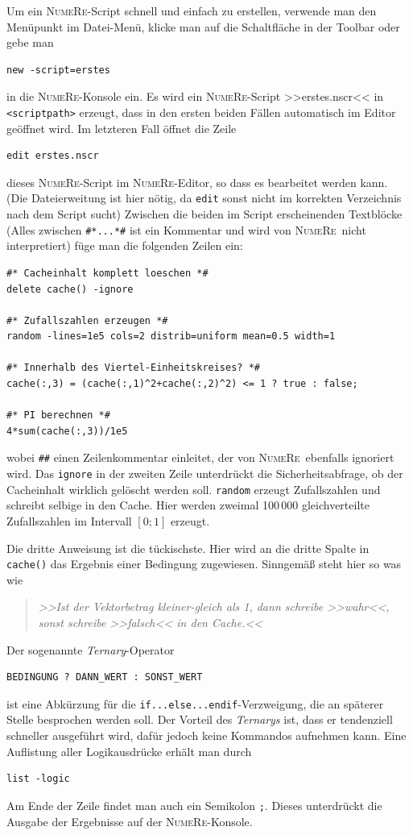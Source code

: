 \documentclass[DIV=14,headsepline,footsepline]{scrbook}
\newcommand{\NR}{\textsc{Nu\-me\-Re}}
\begin{document}
				Um ein \NR-Script schnell und einfach zu erstellen, verwende man den Menüpunkt im Datei-Menü, klicke man auf die Schaltfläche in der Toolbar oder gebe man 
				\begin{lstlisting}
new -script=erstes
				\end{lstlisting}
				in die \NR-Konsole ein. Es wird ein \NR-Script >>erstes.nscr<< in \verb+<scriptpath>+ erzeugt, dass in den ersten beiden Fällen automatisch im Editor geöffnet wird. Im letzteren Fall öffnet die Zeile
				\begin{lstlisting}
edit erstes.nscr
				\end{lstlisting}
				dieses \NR-Script im \NR-Editor, so dass es bearbeitet werden kann. (Die Dateierweitung ist hier nötig, da \verb+edit+ sonst nicht im korrekten Verzeichnis nach dem Script sucht) Zwischen die beiden im Script erscheinenden Textblöcke (Alles zwischen \verb+#*...*#+ ist ein Kommentar und wird von \NR\ nicht interpretiert) füge man die folgenden Zeilen ein:
				\begin{lstlisting}
#* Cacheinhalt komplett loeschen *#
delete cache() -ignore

#* Zufallszahlen erzeugen *#
random -lines=1e5 cols=2 distrib=uniform mean=0.5 width=1

#* Innerhalb des Viertel-Einheitskreises? *#
cache(:,3) = (cache(:,1)^2+cache(:,2)^2) <= 1 ? true : false;

#* PI berechnen *#
4*sum(cache(:,3))/1e5
				\end{lstlisting}
				wobei \verb+##+ einen Zeilenkommentar einleitet, der von \NR\ ebenfalls ignoriert wird. Das \verb+ignore+ in der zweiten Zeile unterdrückt die Sicherheitsabfrage, ob der Cacheinhalt wirklich gelöscht werden soll. \verb+random+ erzeugt Zufallszahlen und schreibt selbige in den Cache. Hier werden zweimal 100\,000 gleichverteilte Zufallszahlen im Intervall $[0;1]$ erzeugt.
				
				Die dritte Anweisung ist die tückischste. Hier wird an die dritte Spalte in \verb+cache()+ das Ergebnis einer Bedingung zugewiesen. Sinngemäß steht hier so was wie
				\begin{quotation}
					\noindent\emph{>>Ist der Vektorbetrag kleiner-gleich als 1, dann schreibe >>wahr<<, sonst schreibe >>falsch<< in den Cache.<<}
				\end{quotation}
				Der sogenannte \emph{Ternary}-Operator
				\begin{lstlisting}
BEDINGUNG ? DANN_WERT : SONST_WERT
				\end{lstlisting}
				ist eine Abkürzung für die \verb+if...else...endif+-Verzweigung, die an späterer Stelle besprochen werden soll. Der Vorteil des \emph{Ternarys} ist, dass er tendenziell schneller ausgeführt wird, dafür jedoch keine Kommandos aufnehmen kann. Eine Auflistung aller Logikausdrücke erhält man durch
				\begin{lstlisting}
list -logic
				\end{lstlisting}
				Am Ende der Zeile findet man auch ein Semikolon \verb+;+. Dieses unterdrückt die Ausgabe der Ergebnisse auf der \NR-Konsole.
				
\end{document}
